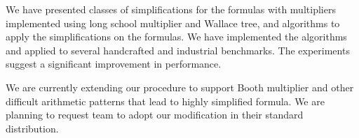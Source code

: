 We have presented classes of simplifications for the formulas with
multipliers implemented using long school multiplier and Wallace tree,
and algorithms to apply the simplifications on the formulas.
%
We have implemented the algorithms and applied to several handcrafted and 
industrial benchmarks.
%
The experiments suggest a significant improvement in performance.

We are currently extending our procedure to support Booth multiplier
and other difficult arithmetic patterns that lead to highly simplified
formula.
%
We are planning to request \zthree team to adopt our modification in their
standard distribution.



